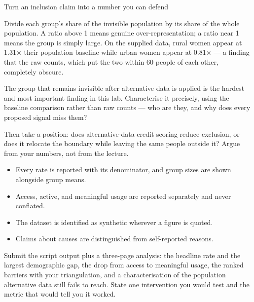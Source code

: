 \begin{labproject}{Turn an inclusion claim into a number you can defend}
\begin{pitfall}
Divide each group's share of the invisible population by its share of the whole population. A ratio above 1 means genuine over-representation; a ratio near 1 means the group is simply large. On the supplied data, rural women appear at 1.31$\times$ their population baseline while urban women appear at 0.81$\times$ --- a finding that the raw counts, which put the two within 60 people of each other, completely obscure.
\end{pitfall}

\begin{tryit}
The group that remains invisible after alternative data is applied is the hardest and most important finding in this lab. Characterise it precisely, using the baseline comparison rather than raw counts --- who are they, and why does every proposed signal miss them?

Then take a position: does alternative-data credit scoring reduce exclusion, or does it relocate the boundary while leaving the same people outside it? Argue from your numbers, not from the lecture.
\end{tryit}
\end{labproject}

\begin{verification}
\begin{itemize}
  \item Every rate is reported with its denominator, and group sizes are shown alongside group means.
  \item Access, active, and meaningful usage are reported separately and never conflated.
  \item The dataset is identified as synthetic wherever a figure is quoted.
  \item Claims about causes are distinguished from self-reported reasons.
\end{itemize}
\end{verification}

\begin{labdeliverable}
Submit the script output plus a three-page analysis: the headline rate and the largest demographic gap, the drop from access to meaningful usage, the ranked barriers with your triangulation, and a characterisation of the population alternative data still fails to reach. State one intervention you would test and the metric that would tell you it worked.
\end{labdeliverable}
